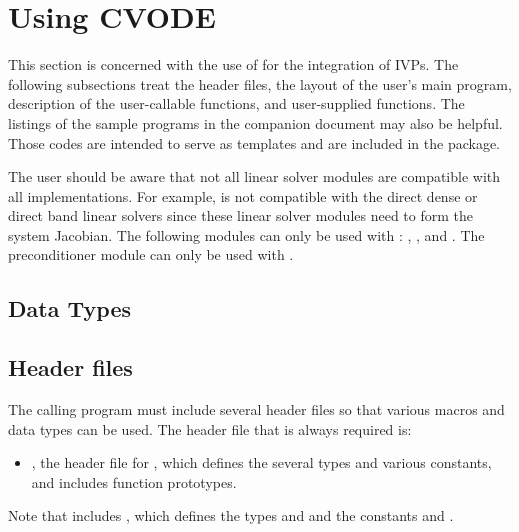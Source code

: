 \chapter{Using CVODE}\label{s:simulation}

This section is concerned with the use of {\cvode} for the integration of IVPs.
The following subsections treat the header files, the layout of the user's main
program, description of the {\cvode} user-callable functions, and user-supplied functions. 
The listings of the sample programs in the companion document \cite{cvode2.1_ex} may also be helpful. 
Those codes are intended to serve as templates and are included in the {\cvode} package.

The user should be aware that not all linear solver modules are compatible 
with all {\nvector} implementations. 
For example, {\nvecp} is not compatible with the direct dense or direct band 
linear solvers since these linear solver modules need to form the system Jacobian.
The following {\cvode} modules can only be used with {\nvecs}:
{\cvdense}, {\cvband}, and {\cvbandpre}. The preconditioner module {\cvbbdpre}
can only be used with {\nvecp}. 

\section{Data Types}\label{s:types}


\section{Header files}\label{ss:header_sim}
The calling program must include several header files so that various macros
and data types can be used. The header file that is always required is:
\begin{itemize}
\item  {}, 
  the header file for {\cvode}, which defines the several
  types and various constants, and includes function prototypes.
\end{itemize}
Note that  includes , 
which defines the types  and 
and the constants  and .

